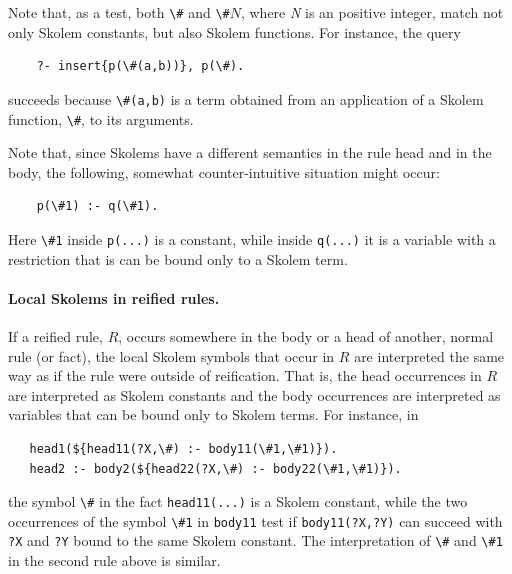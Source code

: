 \documentclass[11pt]{article}
\newcommand{\bs}{\textbackslash}
\begin{document}
Note that, as a test, both \texttt{\bs{}\#} and \texttt{\bs{}\#}$N$, where
\emph{N} is an positive integer, match not only Skolem constants, but also
Skolem functions. For instance, the query
\begin{verbatim}
    ?- insert{p(\#(a,b))}, p(\#).
\end{verbatim}
succeeds because \verb|\#(a,b)| is a term obtained from an application of a
Skolem function, \verb|\#|, to its arguments.

Note that, since Skolems have a different semantics in the rule head and in
the body, the following, somewhat counter-intuitive situation might occur:
\begin{verbatim}
    p(\#1) :- q(\#1).
\end{verbatim}
Here \texttt{\bs{}\#1} inside \texttt{p(...)}  is a constant, while
inside \texttt{q(...)} it is a variable with a restriction that is can be
bound only to a Skolem term.  

\paragraph{Local Skolems in reified rules.}
If a reified rule, $R$,
occurs somewhere in the body or a head of another, normal rule (or fact),
the local Skolem symbols that occur in $R$ are interpreted the same way as if the
rule were outside of reification. That is, the head occurrences in $R$ are
interpreted as Skolem constants and the body occurrences are interpreted as
variables that can be bound only to Skolem terms. For instance, in
\begin{verbatim}
   head1(${head11(?X,\#) :- body11(\#1,\#1)}).
   head2 :- body2(${head22(?X,\#) :- body22(\#1,\#1)}).
\end{verbatim}
the symbol \verb|\#| in the fact \texttt{head11(...)} is a Skolem constant, while the
two occurrences of the symbol \verb|\#1| in \texttt{body11} test if
\texttt{body11(?X,?Y)} can succeed with \texttt{?X} and \texttt{?Y} bound
to the same Skolem constant. The interpretation of \verb|\#| and \verb|\#1|
in the second rule above is similar.    
\end{document}

